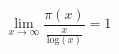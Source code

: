     \begin{center}
        \begin{equation*}
            \lim_{x \to \infty} \frac{\pi(x)}{\frac{x}{\text{log}(x)}} = 1
        \end{equation*}
    \end{center}
